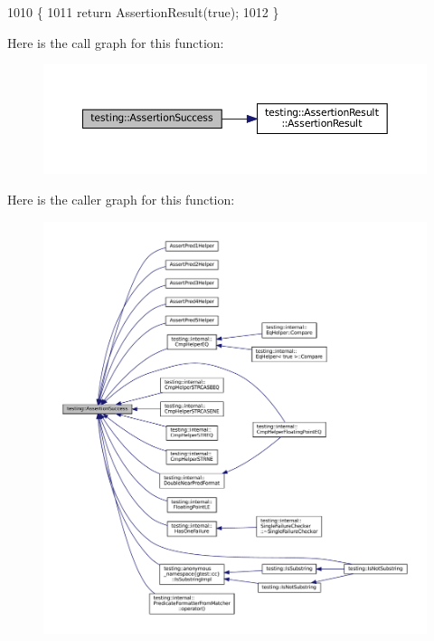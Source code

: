 \begin{DoxyCode}
1010                                    \{
1011   \textcolor{keywordflow}{return} AssertionResult(\textcolor{keyword}{true});
1012 \}
\end{DoxyCode}
Here is the call graph for this function\+:
\nopagebreak
\begin{figure}[H]
\begin{center}
\leavevmode
\includegraphics[width=350pt]{namespacetesting_ac1d0baedb17286c5c6c87bd1a45da8ac_cgraph}
\end{center}
\end{figure}
Here is the caller graph for this function\+:
\nopagebreak
\begin{figure}[H]
\begin{center}
\leavevmode
\includegraphics[width=350pt]{namespacetesting_ac1d0baedb17286c5c6c87bd1a45da8ac_icgraph}
\end{center}
\end{figure}
\mbox{\label{namespacetesting_abfc4121b8708e8b22a096ff8be88a9d0}} 

